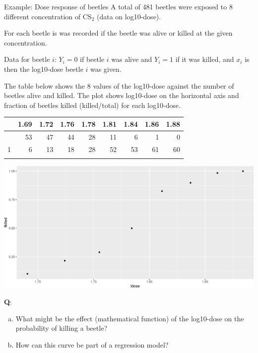 \documentclass[
  ignorenonframetext,
]{beamer}
\providecommand{\tightlist}{%
  \setlength{\itemsep}{0pt}\setlength{\parskip}{0pt}}
\begin{document}
\begin{frame}
\begin{block}{Example: Dose response of beetles}
\protect\hypertarget{example-dose-response-of-beetles}{}
A total of 481 beetles were exposed to 8 different concentration of
CS\(_2\) (data on log10-dose).

For each beetle is was recorded if the beetle was alive or killed at the
given concentration.

Data for beetle \(i\): \(Y_i=0\) if beetle \(i\) was alive and \(Y_i=1\)
if it was killed, and \(x_i\) is then the log10-dose beetle \(i\) was
given.
\end{block}
\end{frame}

\begin{frame}
The table below shows the 8 values of the log10-dose against the number
of beetles alive and killed. The plot shows log10-dose on the horizontal
axis and fraction of beetles killed (killed/total) for each log10-dose.

\begin{longtable}[]{@{}lrrrrrrrr@{}}
\toprule\noalign{}
& 1.69 & 1.72 & 1.76 & 1.78 & 1.81 & 1.84 & 1.86 & 1.88 \\
\midrule\noalign{}
\endhead
0 & 53 & 47 & 44 & 28 & 11 & 6 & 1 & 0 \\
1 & 6 & 13 & 18 & 28 & 52 & 53 & 61 & 60 \\
\bottomrule\noalign{}
\end{longtable}
\end{frame}

\begin{frame}
\includegraphics{Module03PresentationWeek1_files/figure-beamer/unnamed-chunk-2-1.pdf}
\end{frame}

\begin{frame}
\textbf{Q}:

\begin{enumerate}
[a.]
\tightlist
\item
  What might be the effect (mathematical function) of the log10-dose on
  the probability of killing a beetle?
\item
  How can this curve be part of a regression model?
\end{enumerate}
\end{frame}
\end{document}

